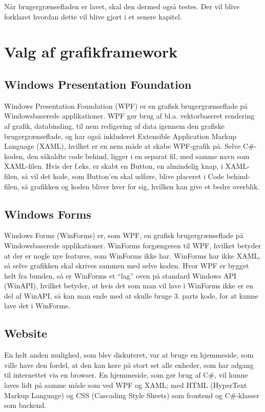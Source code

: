 Når brugergrænsefladen er lavet, skal den dermed også testes. Der vil blive forklaret hvordan dette vil blive gjort i et senere kapitel. 

\section{Valg af grafikframework} 

\subsection{Windows Presentation Foundation}
Windows Presentation Foundation (WPF) er en grafisk brugergrænseflade på Windowsbaserede applikationer. 
WPF gør brug af  bl.a. vektorbaseret rendering af grafik, databinding, til nem redigering af data igennem den grafiske brugergrænseflade, og har også inkluderet Extensible Application Markup Language (XAML), hvilket er en nem måde at skabe WPF-grafik på. 
Selve C\#-koden, den såkaldte code behind, ligger i en separat fil, med samme navn som XAML-filen. 
Hvis der f.eks. er skabt en Button, en almindelig knap, i XAML-filen, så vil det kode, som Button'en skal udføre, blive placeret i Code behind-filen, så grafikken og koden bliver hver for sig, hvilken kan give et bedre overblik.\citep{wpf} 

\subsection{Windows Forms}
Windows Forms (WinForms) er, som WPF, en grafisk brugergrænseflade på Windowsbaserede applikationer. WinForms forgængeren til WPF, hvilket betyder at der er nogle nye features, som WinForms ikke har.
WinForms har ikke XAML, så selve grafikken skal skrives sammen med selve koden. 
Hvor WPF er bygget helt fra bunden, så er WinForms et ``lag'' oven på standard Windows API (WinAPI), hvilket betyder, at hvis det som man vil lave i WinForms ikke er en del af WinAPI, så kan man ende med at skulle bruge 3. parts kode, for at kunne lave det i WinForms.\citep{winforms2}

\subsection{Website}
En helt anden mulighed, som blev diskuteret, var at bruge en hjemmeside, som ville have den fordel, at den kan køre på stort set alle enheder, som har adgang til internettet via en browser. 
En hjemmeside, som gør brug af C\#, vil kunne laves lidt på samme måde som ved WPF og XAML; med HTML (HyperText Markup Language) og CSS (Cascading Style Sheets) som frontend og C\#-klasser som backend. 


